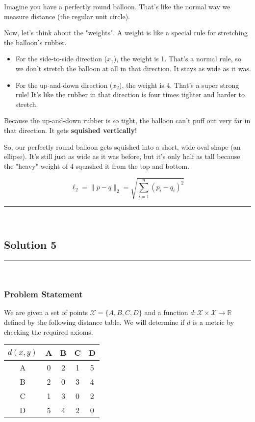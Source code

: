 \documentclass{article}
\begin{document}
\parbox{\textwidth}{
Imagine you have a perfectly round balloon. That's like the normal way we measure distance (the regular unit circle).

Now, let's think about the "weights". A weight is like a special rule for stretching the balloon's rubber.
\begin{itemize}
    \item For the side-to-side direction ($x_1$), the weight is 1. That's a normal rule, so we don't stretch the balloon at all in that direction. It stays as wide as it was.
    \item For the up-and-down direction ($x_2$), the weight is 4. That's a super strong rule! It's like the rubber in that direction is four times tighter and harder to stretch.
\end{itemize}

Because the up-and-down rubber is so tight, the balloon can't puff out very far in that direction. It gets \textbf{squished vertically}!

So, our perfectly round balloon gets squished into a short, wide oval shape (an ellipse). It's still just as wide as it was before, but it's only half as tall because the "heavy" weight of 4 squashed it from the top and bottom.

$$\ell_2 = \|p - q\|_2 = \sqrt{\sum_{i=1}^{n} (p_i - q_i)^2}$$

}

\noindent\rule{\textwidth}{0.4pt}\\

\newpage

\subsection*{Solution 5}
\noindent\rule{\textwidth}{0.4pt}\\
\subsubsection*{Problem Statement}
\parbox{\textwidth}{
We are given a set of points $\mathcal{X}=\{A, B, C, D\}$ and a function $d: \mathcal{X} \times \mathcal{X} \to \mathbb{R}$ defined by the following distance table. We will determine if $d$ is a metric by checking the required axioms.
}
\begin{center}
\renewcommand{\arraystretch}{1.2}
\begin{tabular}{c|cccc}
$d(x,y)$ & A & B & C & D \\
\hline
A & 0 & 2 & 1 & 5 \\
B & 2 & 0 & 3 & 4 \\
C & 1 & 3 & 0 & 2 \\
D & 5 & 4 & 2 & 0
\end{tabular}
\end{center}
\end{document}
